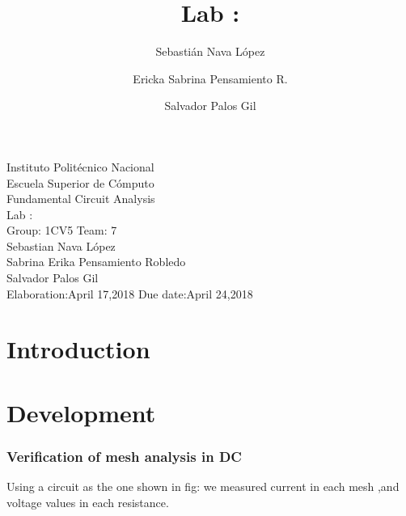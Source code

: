 \documentclass[letterpaper]{article}
\title{Lab :}
\author{
    Sebastián Nava López\\
    \and
    Ericka Sabrina Pensamiento R.\\
    \and
    Salvador Palos Gil
}
\begin{document}
\begin{titlepage}
    \centering
    {\Huge Instituto Politécnico Nacional}\\[3ex]
    {\huge Escuela Superior de Cómputo}\\[8ex]
    {\huge Fundamental Circuit Analysis}\\[12ex]
    {\Large Lab : }\\[20ex]
    {\Large Group: 1CV5 Team: 7 \\[8ex]
    Sebastian Nava López\\[4ex]
    Sabrina Erika Pensamiento Robledo\\[4ex]
    Salvador Palos Gil\\[18ex]
    }
    \large{Elaboration:April 17,2018 \hspace{8em} Due date:April 24,2018}
\end{titlepage}
\tableofcontents
\newpage
\section{Introduction}
\newpage
\section{Development}
\subsubsection{Verification of mesh analysis in DC}
Using a circuit as the one shown in fig: 
we measured current in each mesh ,and voltage values in each resistance.
\end{document}
